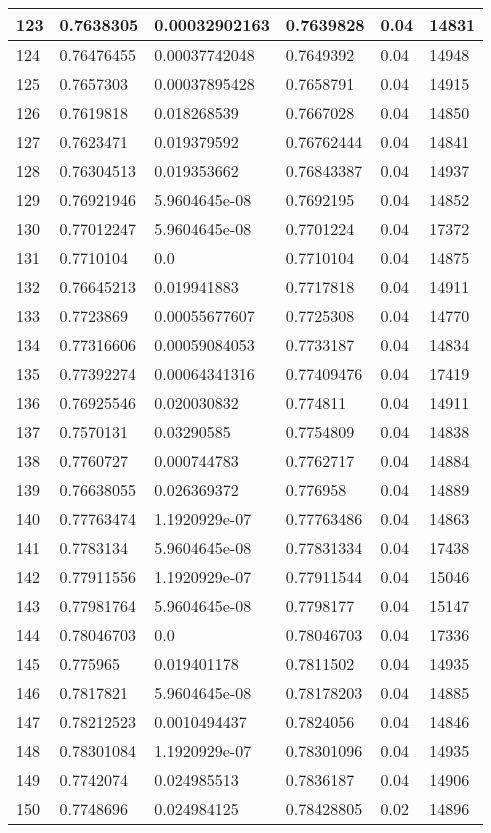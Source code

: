 \begin{longtable}{|l|l|l|l|l|l|}
123 & 0.7638305 & 0.00032902163 & 0.7639828 & 0.04 & 14831 \\ \hline 
124 & 0.76476455 & 0.00037742048 & 0.7649392 & 0.04 & 14948 \\ \hline 
125 & 0.7657303 & 0.00037895428 & 0.7658791 & 0.04 & 14915 \\ \hline 
126 & 0.7619818 & 0.018268539 & 0.7667028 & 0.04 & 14850 \\ \hline 
127 & 0.7623471 & 0.019379592 & 0.76762444 & 0.04 & 14841 \\ \hline 
128 & 0.76304513 & 0.019353662 & 0.76843387 & 0.04 & 14937 \\ \hline 
129 & 0.76921946 & 5.9604645e-08 & 0.7692195 & 0.04 & 14852 \\ \hline 
130 & 0.77012247 & 5.9604645e-08 & 0.7701224 & 0.04 & 17372 \\ \hline 
131 & 0.7710104 & 0.0 & 0.7710104 & 0.04 & 14875 \\ \hline 
132 & 0.76645213 & 0.019941883 & 0.7717818 & 0.04 & 14911 \\ \hline 
133 & 0.7723869 & 0.00055677607 & 0.7725308 & 0.04 & 14770 \\ \hline 
134 & 0.77316606 & 0.00059084053 & 0.7733187 & 0.04 & 14834 \\ \hline 
135 & 0.77392274 & 0.00064341316 & 0.77409476 & 0.04 & 17419 \\ \hline 
136 & 0.76925546 & 0.020030832 & 0.774811 & 0.04 & 14911 \\ \hline 
137 & 0.7570131 & 0.03290585 & 0.7754809 & 0.04 & 14838 \\ \hline 
138 & 0.7760727 & 0.000744783 & 0.7762717 & 0.04 & 14884 \\ \hline 
139 & 0.76638055 & 0.026369372 & 0.776958 & 0.04 & 14889 \\ \hline 
140 & 0.77763474 & 1.1920929e-07 & 0.77763486 & 0.04 & 14863 \\ \hline 
141 & 0.7783134 & 5.9604645e-08 & 0.77831334 & 0.04 & 17438 \\ \hline 
142 & 0.77911556 & 1.1920929e-07 & 0.77911544 & 0.04 & 15046 \\ \hline 
143 & 0.77981764 & 5.9604645e-08 & 0.7798177 & 0.04 & 15147 \\ \hline 
144 & 0.78046703 & 0.0 & 0.78046703 & 0.04 & 17336 \\ \hline 
145 & 0.775965 & 0.019401178 & 0.7811502 & 0.04 & 14935 \\ \hline 
146 & 0.7817821 & 5.9604645e-08 & 0.78178203 & 0.04 & 14885 \\ \hline 
147 & 0.78212523 & 0.0010494437 & 0.7824056 & 0.04 & 14846 \\ \hline 
148 & 0.78301084 & 1.1920929e-07 & 0.78301096 & 0.04 & 14935 \\ \hline 
149 & 0.7742074 & 0.024985513 & 0.7836187 & 0.04 & 14906 \\ \hline 
150 & 0.7748696 & 0.024984125 & 0.78428805 & 0.02 & 14896 \\ \hline 
\end{longtable}